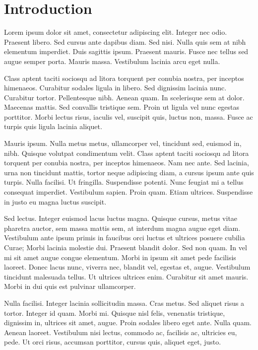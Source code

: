 \chapter{Introduction}

Lorem ipsum dolor sit amet, consectetur adipiscing elit. Integer nec
odio. Praesent libero. Sed cursus ante dapibus diam. Sed nisi. Nulla
quis sem at nibh elementum imperdiet. Duis sagittis ipsum. Praesent
mauris. Fusce nec tellus sed augue semper porta. Mauris massa.
Vestibulum lacinia arcu eget nulla.

Class aptent taciti sociosqu ad litora torquent per conubia nostra, per
inceptos himenaeos. Curabitur sodales ligula in libero. Sed dignissim
lacinia nunc. Curabitur tortor. Pellentesque nibh. Aenean quam. In
scelerisque sem at dolor. Maecenas mattis. Sed convallis tristique sem.
Proin ut ligula vel nunc egestas porttitor. Morbi lectus risus, iaculis
vel, suscipit quis, luctus non, massa. Fusce ac turpis quis ligula
lacinia aliquet.

Mauris ipsum. Nulla metus metus, ullamcorper vel, tincidunt sed, euismod
in, nibh. Quisque volutpat condimentum velit. Class aptent taciti
sociosqu ad litora torquent per conubia nostra, per inceptos himenaeos.
Nam nec ante. Sed lacinia, urna non tincidunt mattis, tortor neque
adipiscing diam, a cursus ipsum ante quis turpis. Nulla facilisi. Ut
fringilla. Suspendisse potenti. Nunc feugiat mi a tellus consequat
imperdiet. Vestibulum sapien. Proin quam. Etiam ultrices. Suspendisse in
justo eu magna luctus suscipit.

Sed lectus. Integer euismod lacus luctus magna. Quisque cursus, metus
vitae pharetra auctor, sem massa mattis sem, at interdum magna augue
eget diam. Vestibulum ante ipsum primis in faucibus orci luctus et
ultrices posuere cubilia Curae; Morbi lacinia molestie dui. Praesent
blandit dolor. Sed non quam. In vel mi sit amet augue congue elementum.
Morbi in ipsum sit amet pede facilisis laoreet. Donec lacus nunc,
viverra nec, blandit vel, egestas et, augue. Vestibulum tincidunt
malesuada tellus. Ut ultrices ultrices enim. Curabitur sit amet mauris.
Morbi in dui quis est pulvinar ullamcorper.

Nulla facilisi. Integer lacinia sollicitudin massa. Cras metus. Sed
aliquet risus a tortor. Integer id quam. Morbi mi. Quisque nisl felis,
venenatis tristique, dignissim in, ultrices sit amet, augue. Proin
sodales libero eget ante. Nulla quam. Aenean laoreet. Vestibulum nisi
lectus, commodo ac, facilisis ac, ultricies eu, pede. Ut orci risus,
accumsan porttitor, cursus quis, aliquet eget, justo.

